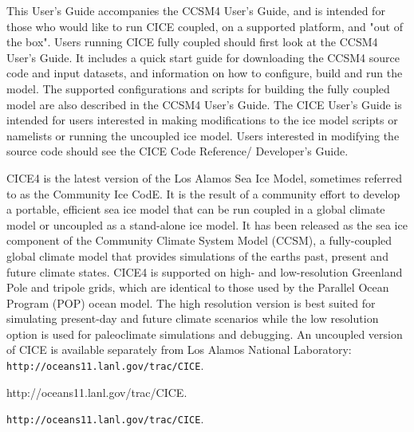 
This User's Guide accompanies the CCSM4 User's Guide, and is intended
for those who would like to run CICE coupled, on a supported
platform, and "out of the box".  Users running CICE fully coupled should first
look at the CCSM4 User's Guide.  It includes a quick start guide for downloading
the CCSM4 source code and input datasets, and information on how to configure,
build and run the model.  The supported configurations and scripts for building
the fully coupled model are also described in the CCSM4 User's Guide.  The CICE
User's Guide is intended for users interested in making modifications to the
ice model scripts or namelists or running the uncoupled ice model.  Users
interested in modifying the source code should see the CICE Code Reference/
Developer's Guide.

CICE4 is the latest version of the Los Alamos Sea Ice Model, sometimes
referred to as the Community Ice CodE.  It is the
result of a community effort to develop a portable, efficient sea ice model
that can be run coupled in a global climate model or uncoupled as a stand-alone
ice model. It has been released as the sea ice component of the Community
Climate System Model (CCSM), a fully-coupled global climate model that
provides simulations of the earths past, present and future climate states.
CICE4 is supported on high- and low-resolution Greenland Pole
and tripole grids, which are identical to those used by the Parallel Ocean 
Program (POP) ocean model.  The high resolution version is best suited for 
simulating present-day and future climate scenarios while the low resolution 
option is used for paleoclimate simulations and debugging.  An uncoupled 
version of CICE is available separately from Los Alamos National Laboratory:\\

\ifpdf
                    {\tt http://oceans11.lanl.gov/trac/CICE}.\\
\else
\begin{htmlonly}
                    {http://oceans11.lanl.gov/trac/CICE}.
\end{htmlonly}
\begin{latexonly}
                    {\tt http://oceans11.lanl.gov/trac/CICE}.
\end{latexonly}
\fi

